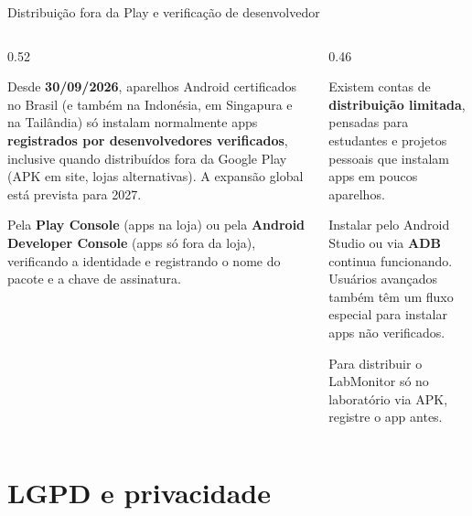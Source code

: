 \documentclass[aspectratio=169,10pt]{beamer}
\begin{document}
\begin{frame}{Distribuição fora da Play e verificação de desenvolvedor}
  \begin{columns}[T]
    \begin{column}{0.52\textwidth}
      \begin{atencao}
        Desde \textbf{30/09/2026}, aparelhos Android certificados no Brasil (e também na Indonésia, em Singapura e na Tailândia) só instalam normalmente apps \textbf{registrados por desenvolvedores verificados}, inclusive quando distribuídos fora da Google Play (APK em site, lojas alternativas). A expansão global está prevista para 2027.
      \end{atencao}
      \begin{conceito}
        Pela \textbf{Play Console} (apps na loja) ou pela \textbf{Android Developer Console} (apps só fora da loja), verificando a identidade e registrando o nome do pacote e a chave de assinatura.
      \end{conceito}
    \end{column}
    \begin{column}{0.46\textwidth}
      \begin{dica}
        Existem contas de \textbf{distribuição limitada}, pensadas para estudantes e projetos pessoais que instalam apps em poucos aparelhos.
      \end{dica}
      \begin{conceito}
        Instalar pelo Android Studio ou via \textbf{ADB} continua funcionando. Usuários avançados também têm um fluxo especial para instalar apps não verificados.
      \end{conceito}
      \begin{dica}
        Para distribuir o LabMonitor só no laboratório via APK, registre o app antes.
      \end{dica}
    \end{column}
  \end{columns}
\end{frame}

\section{LGPD e privacidade}
\end{document}

